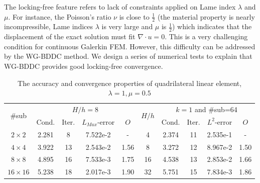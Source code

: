 									The locking-free feature refers to lack of constraints applied on Lame index $ \lambda $ and $ \mu $. For instance, the Poisson's ratio $ \nu $ is close to $ \frac{1}{2} $ (the material property is nearly incompressible, Lame indices $ \lambda $ is very large and $ \mu $ is $ \frac{1}{2} $) which indicates that the displacement of the exact solution must fit $ \nabla \cdot u = 0 $. This is a very challenging condition for continuous Galerkin FEM. However, this difficulty can be addressed by the WG-BDDC method. We design a series of numerical tests to explain that WG-BDDC provides good locking-free convergence.
									\vspace{5mm}
									\begin{table}[H]
										\small
										\vspace{-10pt}
										\setlength{\tabcolsep}{1pt} {
											\vspace{-5pt}
											\begin{center}
												\begin{tabular}{c|cccc|c|cccc}
													\hline
													\multirow{2}{*}{\#sub} &\multicolumn{4}{c|}{ $H/h=8$} &\multirow{2}{*}{$H/h$} &\multicolumn{4}{c}{$k=1$ and \#sub=64}\\ 
													& Cond.   & Iter. &$L_{Max}$-error & $O$& & Cond.   & Iter. &$L^2$-error & $O$ \\
													
													\hline
													$2\times 2$     & 2.281 & 8   & 7.522e-2 & - & 4   & 2.374 &11 & 2.535e-1 &- \\
													$4\times 4$     &3.922 &13 &2.543e-2 & 1.56 & 8   & 3.272 &12 & 8.967e-2 & 1.50  \\
													$8\times 8$  & 4.895 &16 & 7.533e-3 & 1.75 & 16   & 4.538 &13 & 2.853e-2 & 1.66 \\
													$16\times 16$ &5.238&18 & 2.017e-3 & 1.90 & 32   & 5.751 &15 & 7.834e-3 & 1.86 \\
													\hline	
												\end{tabular}
											\end{center} }
											\caption{The accuracy and convergence properties of quadrilateral linear element, $ \lambda = 1, \mu = 0.5 $}
											\label{Tab:lockfree1}
										\end{table}
										\vspace{5mm}
